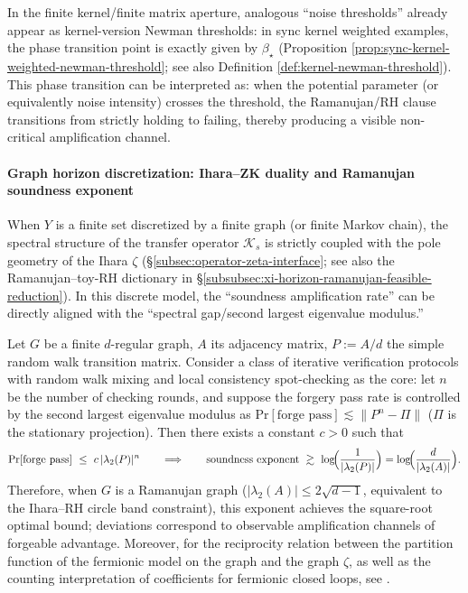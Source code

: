 \begin{remark}\label{rem:xi-hzom-kernel-newman-threshold}
In the finite kernel/finite matrix aperture, analogous ``noise thresholds'' already appear as kernel-version Newman thresholds: in sync kernel weighted examples, the phase transition point is exactly given by \(\beta_{\star}\) (Proposition \ref{prop:sync-kernel-weighted-newman-threshold}; see also Definition \ref{def:kernel-newman-threshold}).
This phase transition can be interpreted as: when the potential parameter (or equivalently noise intensity) crosses the threshold, the Ramanujan/RH clause transitions from strictly holding to failing, thereby producing a visible non-critical amplification channel.
\end{remark}

\paragraph{Graph horizon discretization: Ihara--ZK duality and Ramanujan soundness exponent}
When \(Y\) is a finite set discretized by a finite graph (or finite Markov chain), the spectral structure of the transfer operator \(\mathcal{K}_s\) is strictly coupled with the pole geometry of the Ihara \(\zeta\) (\S\ref{subsec:operator-zeta-interface}; see also the Ramanujan--toy-RH dictionary in \S\ref{subsubsec:xi-horizon-ramanujan-feasible-reduction}).
In this discrete model, the ``soundness amplification rate'' can be directly aligned with the ``spectral gap/second largest eigenvalue modulus.''

\begin{proposition}\label{prop:xi-ihara-zk-soundness-exponent}
Let \(G\) be a finite \(d\)-regular graph, \(A\) its adjacency matrix, \(P:=A/d\) the simple random walk transition matrix.
Consider a class of iterative verification protocols with random walk mixing and local consistency spot-checking as the core: let \(n\) be the number of checking rounds, and suppose the forgery pass rate is controlled by the second largest eigenvalue modulus as
\(
\mathrm{Pr}[\text{forge pass}]\lesssim \|P^{n}-\Pi\|
\)
(\(\Pi\) is the stationary projection).
Then there exists a constant \(c>0\) such that
\[
\mathrm{Pr}[\text{forge pass}]\ \le\ c\,|\lambda_2(P)|^{n}
\qquad\Longrightarrow\qquad
\text{soundness exponent}\ \gtrsim\ \log\!\Bigl(\frac{1}{|\lambda_2(P)|}\Bigr)=\log\!\Bigl(\frac{d}{|\lambda_2(A)|}\Bigr).
\]
Therefore, when \(G\) is a Ramanujan graph (\(|\lambda_2(A)|\le 2\sqrt{d-1}\), equivalent to the Ihara--RH circle band constraint), this exponent achieves the square-root optimal bound;
deviations correspond to observable amplification channels of forgeable advantage.
Moreover, for the reciprocity relation between the partition function of the fermionic model on the graph and the graph \(\zeta\), as well as the counting interpretation of coefficients for fermionic closed loops, see \cite{MatsuuraOhta2025FermionsZetaGraph}.
\end{proposition}

